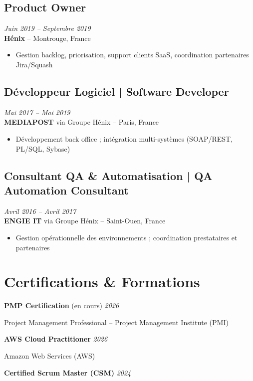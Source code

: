 \documentclass[11pt,a4paper]{article}
\begin{document}
\subsection*{Product Owner} \hfill \textit{Juin 2019 -- Septembre 2019}\\
\textbf{Hénix} -- Montrouge, France
\begin{itemize}
    \item Gestion backlog, priorisation, support clients SaaS, coordination partenaires Jira/Squash
\end{itemize}

\subsection*{Développeur Logiciel | Software Developer} \hfill \textit{Mai 2017 -- Mai 2019}\\
\textbf{MEDIAPOST} via Groupe Hénix -- Paris, France
\begin{itemize}
    \item Développement back office ; intégration multi-systèmes (SOAP/REST, PL/SQL, Sybase)
\end{itemize}

\subsection*{Consultant QA \& Automatisation | QA Automation Consultant} \hfill \textit{Avril 2016 -- Avril 2017}\\
\textbf{ENGIE IT} via Groupe Hénix -- Saint-Ouen, France
\begin{itemize}
    \item Gestion opérationnelle des environnements ; coordination prestataires et partenaires
\end{itemize}

\section*{Certifications \& Formations}

\textbf{PMP Certification} (en cours) \hfill \textit{2026}

Project Management Professional -- Project Management Institute (PMI)

\textbf{AWS Cloud Practitioner} \hfill \textit{2026}

Amazon Web Services (AWS)

\textbf{Certified Scrum Master (CSM)} \hfill \textit{2024}
\end{document}
